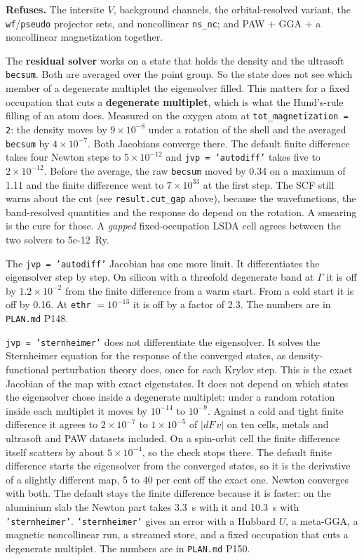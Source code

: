 \documentclass[11pt,a4paper]{article}
\newcommand{\code}[1]{\texttt{\small #1}}
\begin{document}
\begin{refuses}
\textbf{Refuses.} The intersite $V$, background channels, the
orbital-resolved variant, the \code{wf}/\code{pseudo} projector sets, and
noncollinear \code{ns\_nc}; and PAW $+$ GGA $+$ a noncollinear magnetization
together.

The \textbf{residual solver} works on a state that holds the density and the
ultrasoft \code{becsum}. Both are averaged over the point group. So the state
does not see which member of a degenerate multiplet the eigensolver filled. This
matters for a fixed occupation that cuts a \textbf{degenerate multiplet}, which
is what the Hund's-rule filling of an atom does. Measured on the oxygen atom at
\code{tot\_magnetization = 2}: the density moves by $9\times10^{-8}$ under a
rotation of the shell and the averaged \code{becsum} by $4\times10^{-7}$. Both
Jacobians converge there. The default finite difference takes four Newton steps
to $5\times10^{-12}$ and \code{jvp = 'autodiff'} takes five to
$2\times10^{-12}$. Before the average, the raw \code{becsum} moved by 0.34 on a
maximum of 1.11 and the finite difference went to $7\times10^{33}$ at the first
step. The SCF still warns about the cut (see \code{result.cut\_gap} above),
because the wavefunctions, the band-resolved quantities and the response do
depend on the rotation. A smearing is the cure for those. A \emph{gapped}
fixed-occupation LSDA cell agrees between the two solvers to 5e-12~Ry.

The \code{jvp = 'autodiff'} Jacobian has one more limit. It differentiates the
eigensolver step by step. On silicon with a threefold degenerate band at
$\Gamma$ it is off by $1.2\times10^{-2}$ from the finite difference from a warm
start. From a cold start it is off by 0.16. At \code{ethr} $=10^{-13}$ it is off
by a factor of 2.3. The numbers are in \code{PLAN.md} P148.

\code{jvp = 'sternheimer'} does not differentiate the eigensolver. It solves the
Sternheimer equation for the response of the converged states, as
density-functional perturbation theory does, once for each Krylov step. This is
the exact Jacobian of the map with exact eigenstates. It does not depend on
which states the eigensolver chose inside a degenerate multiplet: under a random
rotation inside each multiplet it moves by $10^{-14}$ to $10^{-9}$. Against a
cold and tight finite difference it agrees to $2\times10^{-7}$ to
$1\times10^{-5}$ of $|dF\,v|$ on ten cells, metals and ultrasoft and PAW
datasets included. On a spin-orbit cell the finite difference itself scatters by
about $5\times10^{-4}$, so the check stops there. The default finite difference starts the eigensolver from the
converged states, so it is the derivative of a slightly different map, 5 to 40
per cent off the exact one. Newton converges with both. The default stays the
finite difference because it is faster: on the aluminium slab the Newton part
takes 3.3~s with it and 10.3~s with \code{'sternheimer'}. \code{'sternheimer'}
gives an error with a Hubbard $U$, a meta-GGA, a magnetic noncollinear run, a
streamed store, and a fixed occupation that cuts a degenerate multiplet. The
numbers are in \code{PLAN.md} P150.
\end{refuses}
\end{document}
